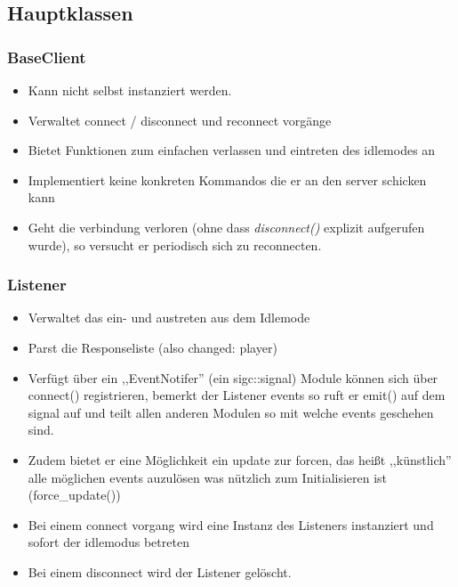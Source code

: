 
\subsection{Hauptklassen}

\subsubsection{BaseClient}
\begin{itemize}
    \item Kann nicht selbst instanziert werden.
    \item Verwaltet connect / disconnect und reconnect vorgänge
    \item Bietet Funktionen zum einfachen verlassen und eintreten des idlemodes an 
    \item Implementiert keine konkreten Kommandos die er an den server schicken kann
    \item Geht die verbindung verloren (ohne dass \emph{disconnect()} explizit aufgerufen wurde),
        so versucht er periodisch sich zu reconnecten.
\end{itemize}

\subsubsection{Listener}
\begin{itemize}
    \item Verwaltet das ein- und austreten aus dem Idlemode
    \item Parst die Responseliste (also changed: player)
    \item Verfügt über ein ,,EventNotifer'' (ein sigc::signal)
        Module können sich über connect() registrieren,
        bemerkt der Listener events so ruft er emit() auf dem signal auf
        und teilt allen anderen Modulen so mit welche events geschehen sind.
    \item Zudem bietet er eine Möglichkeit ein update zur forcen, das heißt ,,künstlich'' alle
        möglichen events auzulösen was nützlich zum Initialisieren ist (force\_update())
    \item Bei einem connect vorgang wird eine Instanz des Listeners instanziert und 
        sofort der idlemodus betreten
    \item Bei einem disconnect wird der Listener gelöscht.
\end{itemize}

